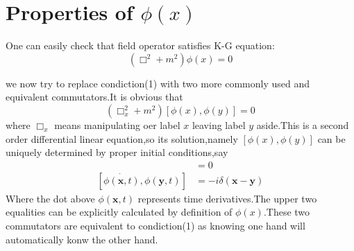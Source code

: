 \documentclass[a4paper]{article}
\begin{document}
\section{Properties of $\phi(x)$}
One can easily check that field operator satisfies K-G equation:$$(\Box^2+m^2)\phi(x)=0$$
\par we now try to replace condiction(1) with two more commonly used and equivalent commutators.It is obvious that$$(\Box_{x}^{2}+m^2)[\phi(x),\phi(y)]=0$$where $\Box_{x}$ means manipulating oer label $x$ leaving label $y$ aside.This is a second order differential linear equation,so its solution,namely $[\phi(x),\phi(y)]$ can be uniquely determined by proper initial conditions,say
\begin{align*}
	[\phi(\bm{x},t),\phi(\bm{y},t)]&=0\\
	[\dot{\phi(\bm{x},t)},\phi(\bm{y},t)]&=-i\delta(\bm{x}-\bm{y})
\end{align*}
Where the dot above $\phi(\bm{x},t)$ represents time derivatives.The upper two equalities can be explicitly calculated by definition of $\phi(x)$.These two commutators are equivalent to condiction(1) as knowing one hand will automatically konw the other hand.
\end{document}
